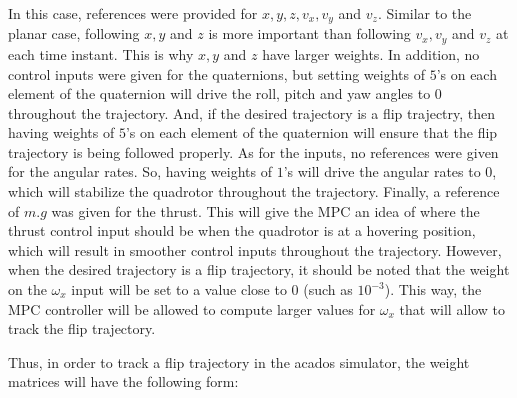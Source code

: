 \documentclass{thesisreport}
\begin{document}
In this case, references were provided for $x,y,z,v_x,v_y$ and $v_z$. Similar to the planar case, following $x,y$ and $z$ is more important than following $v_x,v_y$ and $v_z$ at each time instant. This is why $x,y$ and $z$ have larger weights. In addition, no control inputs were given for the quaternions, but setting weights of $5$'s on each element of the quaternion will drive the roll, pitch and yaw angles to 0 throughout the trajectory. And, if the desired trajectory is a flip trajectry, then having weights of $5$'s on each element of the quaternion will ensure that the flip trajectory is being followed properly.
As for the inputs, no references were given for the angular rates. So, having weights of $1$'s will drive the angular rates to 0, which will stabilize the quadrotor throughout the trajectory. Finally, a reference of $m.g$ was given for the thrust. This will give the MPC an idea of where the thrust control input should be when the quadrotor is at a hovering position, which will result in smoother control inputs throughout the trajectory. However, when the desired trajectory is a flip trajectory, it should be noted that the weight on the $\omega_x$ input will be set to a value close to $0$ (such as $10^{-3}$). This way, the MPC controller will be allowed to compute larger values for $\omega_x$ that will allow to track the flip trajectory.

Thus, in order to track a flip trajectory in the acados simulator, the weight matrices will have the following form:
\end{document}
